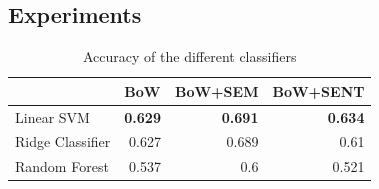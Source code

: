 

\subsection{Experiments}

\begin{table}[]
\centering
\begin{tabular}{l|r|r|r|}
\cline{2-4}
                                       & \multicolumn{1}{l|}{BoW} & \multicolumn{1}{l|}{BoW+SEM} & \multicolumn{1}{l|}{BoW+SENT} \\ \hline
\multicolumn{1}{|l|}{Linear SVM}       & \textbf{0.629}           & \textbf{0.691}               & \textbf{0.634}                \\ \hline
\multicolumn{1}{|l|}{Ridge Classifier} & 0.627                    & 0.689                        & 0.61                          \\ \hline
\multicolumn{1}{|l|}{Random Forest}    & 0.537                    & 0.6                          & 0.521                         \\ \hline
\end{tabular}
\caption{Accuracy of the different classifiers}
\label{tbl:similarity:classifiers}
\end{table}

